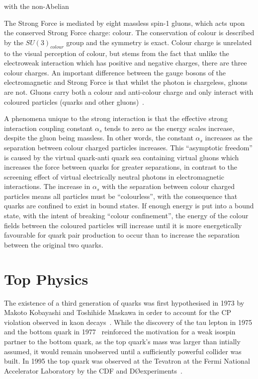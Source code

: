  with the non-Abelian 

The Strong Force is mediated by eight massless spin-1 gluons, which acts upon the conserved Strong Force charge: colour\cite{ElectroweakStrong}. 
The conservation of colour is described by the $SU(3)_{colour}$ group and the symmetry is exact. 
Colour charge is unrelated to the visual perception of colour, but stems from the fact that unlike the electroweak interaction which has positive and negative charges, there are three colour charges. 
An important difference between the gauge bosons of the electromagnetic and Strong Force is that whilst the photon is chargeless, gluons are not. 
Gluons carry both a colour and anti-colour charge and only interact with coloured particles (quarks and other gluons)~\cite{ElectroweakStrong}. 


A phenomena unique to the strong interaction is that the effective strong interaction coupling constant $\alpha_{s}$ tends to zero as the energy scales increase, despite the gluon being massless. 
In other words, the constant $\alpha_{s}$ increases as the separation between colour charged particles increases. 
This ``asymptotic freedom'' is caused by the virtual quark-anti quark sea containing virtual gluons which increases the force between quarks for greater separations, in contrast to the screening effect of virtual electrically neutral photons in electromagnetic interactions. 
The increase in $\alpha_{s}$ with the separation between colour charged particles means all particles must be ``colourless'', with the consequence that quarks are confined to exist in bound states\cite{ElectroweakStrong}. 
If enough energy is put into a bound state, with the intent of breaking ``colour confinement'', the energy of the colour fields between the coloured particles will increase until it is more energetically favourable for quark pair production to occur than to increase the separation between the original two quarks\cite{Griffiths}. 



\section{Top Physics}\label{sec:top-physics}
The existence of a third generation of quarks was first hypothesised in 1973 by Makoto Kobayashi and Toshihide Maskawa in order to account for the CP violation observed in kaon decays~\cite{Kobayashi:1973fv}.
While the discovery of the tau lepton in 1975 and the bottom quark in 1977~\cite{Herb:1977ek} reinforced the motivation for a weak isospin partner to the bottom quark, as the top quark's mass was larger than intially assumed, it would remain unobserved until a sufficiently powerful collider was built.
In 1995 the top quark was observed at the Tevatron at the Fermi National Accelerator Laboratory by the CDF and D\O experiments~\cite{Abe:1995hr,D0:1995jca}.

